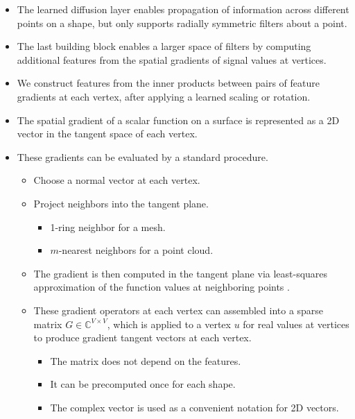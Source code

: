\documentclass[10pt]{article}
\begin{document}
\begin{itemize}
    \item The learned diffusion layer enables propagation of information across different points on a shape, but only supports radially symmetric filters about a point.
    
    \item The last building block enables a larger space of filters by computing additional features from the spatial gradients of signal values at vertices.
    
    \item We construct features from the inner products between pairs of feature gradients at each vertex, after applying a learned scaling or rotation.
    
    \item The spatial gradient of a scalar function on a surface is represented as a 2D vector in the tangent space of each vertex.
    
    \item These gradients can be evaluated by a standard procedure.
    \begin{itemize}
        \item Choose a normal vector at each vertex.
        
        \item Project neighbors into the tangent plane.
        \begin{itemize}
            \item 1-ring neighbor for a mesh.
            \item $m$-nearest neighbors for a point cloud.
        \end{itemize}
        
        \item The gradient is then computed in the tangent plane via least-squares approximation of the function values at neighboring points \cite{Mukherjee:2006}.
        
        \item These gradient operators at each vertex can assembled into a sparse matrix $G \in \mathbb{C}^{V \times V}$, which is applied to a vertex $u$ for real values at vertices to produce gradient tangent vectors at each vertex.
        \begin{itemize}
            \item The matrix does not depend on the features.
            \item It can be precomputed once for each shape.
            \item The complex vector is used as a convenient notation for 2D vectors.
        \end{itemize}
    \end{itemize}


\end{itemize}
\end{document}
